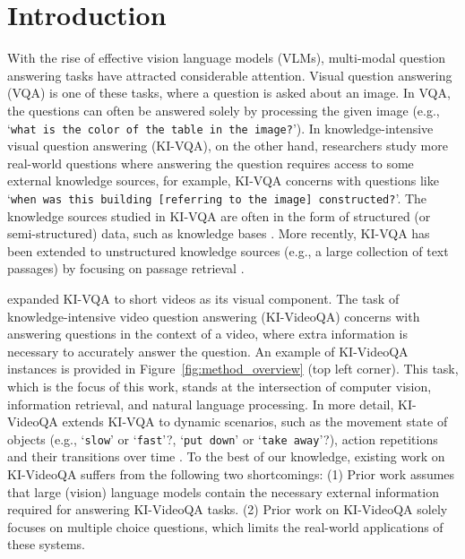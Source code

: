 \section{Introduction}
With the rise of effective vision language models (VLMs), multi-modal question answering tasks have attracted considerable attention. Visual question answering (VQA) \cite{antol2015vqa, goyal2017making} is one of these tasks, where a question is asked about an image. In VQA, the questions can often be answered solely by processing the given image (e.g., `\texttt{what is the color of the table in the image?}'). In knowledge-intensive visual question answering (KI-VQA), on the other hand, researchers study more real-world questions where answering the question requires access to some external knowledge sources, for example, KI-VQA concerns with questions like `\texttt{when was this building [referring to the image] constructed?}'. The knowledge sources studied in KI-VQA are often in the form of structured (or semi-structured) data, such as knowledge bases \cite{marino2019ok,mavex,krisp,kat,unifer,wang2015explicit}. More recently, KI-VQA has been extended to unstructured knowledge sources (e.g., a large collection of text passages) by focusing on passage retrieval \cite{Qu2021KIVQA,Salemi2023ICTIR,Salemi2023MMFID}.

\citet{garcia2020knowit}  expanded KI-VQA to short videos as its visual component.  The task of knowledge-intensive video question answering (KI-VideoQA) concerns with answering questions in the context of a video, where extra information is necessary to accurately answer the question. An example of KI-VideoQA instances is provided in Figure~\ref{fig:method_overview} (top left corner). This task, which is the focus of this work, stands at the intersection of computer vision, information retrieval, and natural language processing. In more detail, KI-VideoQA extends KI-VQA to dynamic scenarios, such as the movement state of objects (e.g., `\texttt{slow}' or `\texttt{fast}'?, `\texttt{put down}' or `\texttt{take away}'?), action repetitions and their transitions over time \citep{jang2017tgif,jang2019video}. To the best of our knowledge, existing work on KI-VideoQA suffers from the following two shortcomings: (1) Prior work assumes that large (vision) language models contain the necessary external information required for answering KI-VideoQA tasks. (2) Prior work on KI-VideoQA  solely focuses on multiple choice questions, which limits the real-world applications of these systems.

